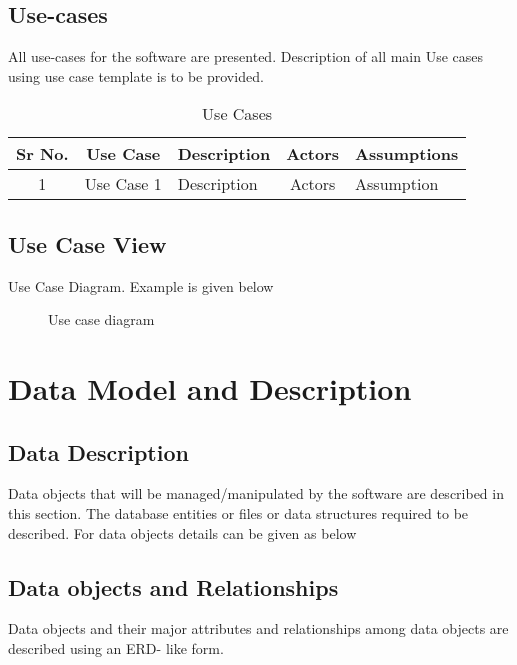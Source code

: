 \documentclass[oneside,a4paper,12pt]{report}
\begin{document}
\subsection{Use-cases}
All use-cases for the software are presented. Description of all main Use cases using use case template is to be provided.

\begin{table}[!htbp]
\begin{center}
\def\arraystretch{1.5}
\begin{tabularx}{\textwidth}{| c | c | X | c | X |}
\hline
Sr No.	& Use Case	& Description	& Actors	& Assumptions \\
\hline
1& Use Case 1 & Description & Actors & Assumption \\
\hline
\end{tabularx}
\end{center}
\caption{Use Cases}
\label{tab:usecase}
\end{table}


\subsection{Use Case View}
Use Case Diagram. Example is given below
\begin{center}
	\begin{figure}[!htbp]
		\centering
	  \caption{Use case diagram}
	  \label{fig:usecase}
	\end{figure}
\end{center}  

\section{Data Model and Description}  
\subsection{Data Description}  
Data objects that will be managed/manipulated by the software are described in this section. The database entities or files or data structures  required to be described. For data objects details can be given as below
\subsection{Data objects and Relationships}
  Data objects and their major attributes and relationships among data objects are described using an ERD- like form.
\end{document}
